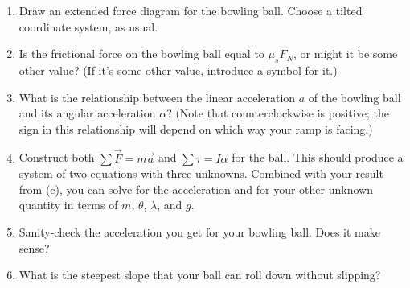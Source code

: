 \documentclass[12pt]{article}
\begin{document}
\begin{enumerate}
\begin{enumerate}
\item Draw an extended force diagram for the bowling ball. Choose a tilted coordinate system, as usual.
\item Is the frictional force on the bowling ball equal to $\mu_s F_N$, or might it be some other value? (If it's some other value, introduce a symbol for it.)
\item What is the relationship between the linear acceleration $a$ of the bowling ball and its angular acceleration $\alpha$? (Note that counterclockwise is positive; the sign in this relationship will depend on which way your ramp is facing.)
\item Construct both $\sum \vec F = m \vec a$ and $\sum \tau = I \alpha$ for the ball. This should produce a system of 
two equations with three unknowns. Combined with your result from (c), you can solve for the acceleration and for your 
other unknown quantity in terms of $m$, $\theta$, $\lambda$, and $g$.
\item Sanity-check the acceleration you get for your bowling ball. Does it make sense?
\item What is the steepest slope that your ball can roll down without slipping?
\end{enumerate}
\end{enumerate}
\end{document}
